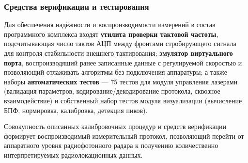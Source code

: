 \subsubsection{Средства верификации и тестирования}

Для обеспечения надёжности и воспроизводимости измерений в состав
программного комплекса входят \textbf{утилита проверки тактовой частоты},
подсчитывающая число тактов АЦП между фронтами стробирующего сигнала для
контроля стабильности внешнего тактирования; \textbf{эмулятор виртуального
порта}, воспроизводящий ранее записанные данные с регулируемой скоростью и
позволяющий отлаживать алгоритмы без подключения аппаратуры; а также наборы
\textbf{автоматических тестов} --- 75 тестов для модуля управления лазерами
(валидация параметров, кодирование/декодирование протокола, сквозное
взаимодействие) и собственный набор тестов модуля визуализации (вычисление
БПФ, нормировка, калибровка, детекция пиков).

Совокупность описанных калибровочных процедур и средств верификации
формирует воспроизводимый измерительный протокол, позволяющий перейти от
аппаратного уровня радиофотонного радара к получению количественно
интерпретируемых радиолокационных данных.
